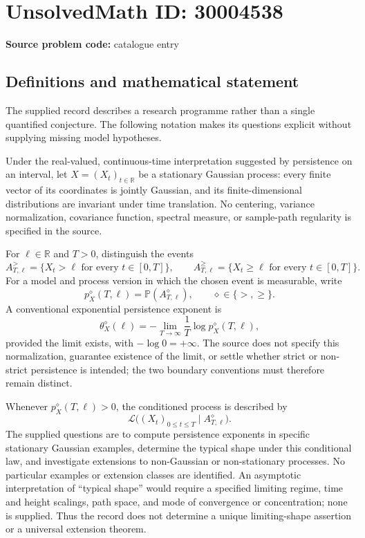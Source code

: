 \documentclass[11pt]{article}
\newcommand{\R}{\mathbb{R}}
\begin{document}
\section*{UnsolvedMath ID: 30004538}
\textbf{Source problem code:} catalogue entry
\subsection{Definitions and mathematical statement}
The supplied record describes a research programme rather than a single quantified conjecture. The following notation makes its questions explicit without supplying missing model hypotheses.

Under the real-valued, continuous-time interpretation suggested by persistence on an interval, let \(X=(X_t)_{t\in\R}\) be a stationary Gaussian process: every finite vector of its coordinates is jointly Gaussian, and its finite-dimensional distributions are invariant under time translation. No centering, variance normalization, covariance function, spectral measure, or sample-path regularity is specified in the source.

For \(\ell\in\R\) and \(T>0\), distinguish the events
\[
 A^{>}_{T,\ell}=\{X_t>\ell\text{ for every }t\in[0,T]\},
 \qquad
 A^{\ge}_{T,\ell}=\{X_t\ge\ell\text{ for every }t\in[0,T]\}.
\]
For a model and process version in which the chosen event is measurable, write
\[
 p_X^{\diamond}(T,\ell)=\mathbb P(A^{\diamond}_{T,\ell}),
 \qquad \diamond\in\{>,\ge\}.
\]
A conventional exponential persistence exponent is
\[
 \theta_X^{\diamond}(\ell)
 =-\lim_{T\to\infty}\frac{1}{T}\log p_X^{\diamond}(T,\ell),
\]
provided the limit exists, with \(-\log 0=+\infty\). The source does not specify this normalization, guarantee existence of the limit, or settle whether strict or non-strict persistence is intended; the two boundary conventions must therefore remain distinct.

Whenever \(p_X^{\diamond}(T,\ell)>0\), the conditioned process is described by
\[
 \mathcal L\bigl((X_t)_{0\le t\le T}\mid A^{\diamond}_{T,\ell}\bigr).
\]
The supplied questions are to compute persistence exponents in specific stationary Gaussian examples, determine the typical shape under this conditional law, and investigate extensions to non-Gaussian or non-stationary processes. No particular examples or extension classes are identified. An asymptotic interpretation of ``typical shape'' would require a specified limiting regime, time and height scalings, path space, and mode of convergence or concentration; none is supplied. Thus the record does not determine a unique limiting-shape assertion or a universal extension theorem.
\end{document}
